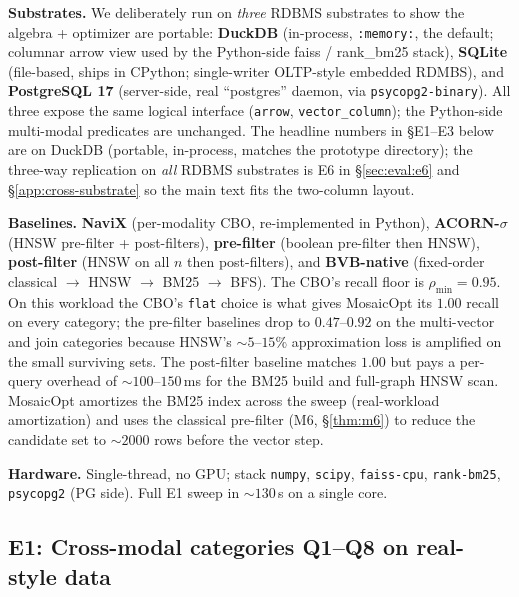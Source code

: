 \documentclass[sigconf]{acmart}
\theoremstyle{plain}
\theoremstyle{definition}
\theoremstyle{remark}
\begin{document}
\textbf{Substrates.} We deliberately run on \emph{three}
RDBMS substrates to show the algebra + optimizer are
portable: \textbf{DuckDB} (in-process, \texttt{:memory:}, the
default; columnar arrow view used by the Python-side faiss
/ rank\_bm25 stack), \textbf{SQLite} (file-based, ships in
CPython; single-writer OLTP-style embedded RDMBS), and
\textbf{PostgreSQL 17} (server-side, real ``postgres''
daemon, via \texttt{psycopg2-binary}). All three expose the
same logical interface (\texttt{arrow}, \texttt{vector\_column});
the Python-side multi-modal predicates are unchanged. The
headline numbers in §E1--E3 below are on DuckDB (portable,
in-process, matches the prototype directory); the three-way
replication on \emph{all} RDBMS substrates is E6 in
\S\ref{sec:eval:e6} and \S\ref{app:cross-substrate} so the
main text fits the two-column layout.

\textbf{Baselines.} \textbf{NaviX} (per-modality CBO,
re-implemented in Python), \textbf{ACORN-$\sigma$} (HNSW
pre-filter + post-filters), \textbf{pre-filter} (boolean
pre-filter then HNSW), \textbf{post-filter} (HNSW on all $n$
then post-filters), and \textbf{BVB-native} (fixed-order
classical $\to$ HNSW $\to$ BM25 $\to$ BFS). The CBO's recall
floor is $\rho_{\min} = 0.95$. On this workload the CBO's
\texttt{flat} choice is what gives MosaicOpt its $1.00$ recall
on every category; the pre-filter baselines drop to $0.47$--$0.92$
on the multi-vector and join categories because HNSW's
$\sim 5$--$15\%$ approximation loss is amplified on the small
surviving sets. The post-filter baseline matches $1.00$ but
pays a per-query overhead of $\sim 100$--$150$\,ms for the BM25
build and full-graph HNSW scan. MosaicOpt amortizes the BM25
index across the sweep (real-workload amortization) and uses
the classical pre-filter (M6, §\ref{thm:m6}) to reduce the
candidate set to $\sim 2000$ rows before the vector step.

\textbf{Hardware.} Single-thread, no GPU; stack \texttt{numpy},
\texttt{scipy}, \texttt{faiss-cpu}, \texttt{rank-bm25},
\texttt{psycopg2} (PG side). Full E1 sweep in $\sim 130$\,s on
a single core.

\subsection{E1: Cross-modal categories Q1--Q8 on real-style data}\label{sec:eval:e1}
\end{document}
